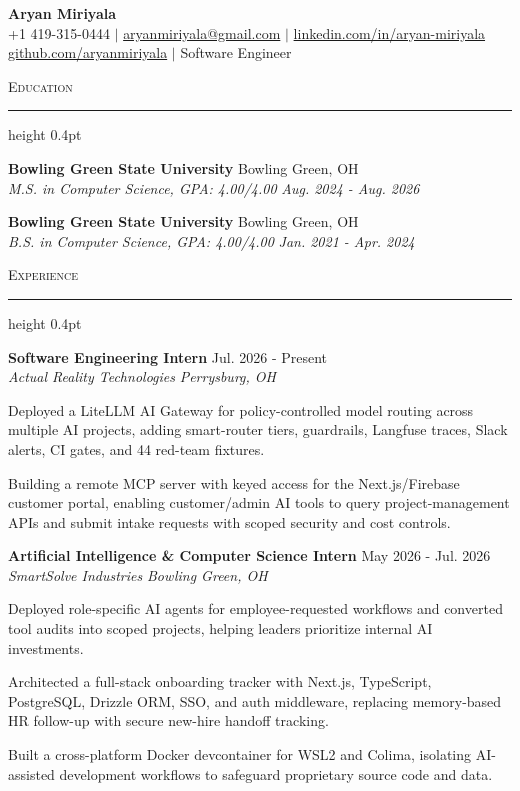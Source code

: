 \documentclass[letterpaper,11pt]{article}
\newcommand{\resumesection}[1]{%
  \par\vspace{2pt}%
  {\large\scshape #1}\par\vspace{2pt}%
  \hrule height 0.4pt\vspace{2pt}%
}
\newcommand{\resumeSubheading}[4]{
  \textbf{#1} \hfill #2\\
  \textit{#3} \hfill \textit{#4}
}
\begin{document}
\begin{center}
  {\LARGE \textbf{Aryan Miriyala}}\\[2pt]
  \small
  +1 419-315-0444 $|$ \href{mailto:aryanmiriyala@gmail.com}{aryanmiriyala@gmail.com} $|$ \href{https://www.linkedin.com/in/aryan-miriyala-7788a21b6/}{linkedin.com/in/aryan-miriyala}\\
  \href{https://github.com/aryanmiriyala}{github.com/aryanmiriyala} $|$ Software Engineer
\end{center}\vspace{-6pt}

\resumesection{Education}
\resumeSubheading
{Bowling Green State University}{Bowling Green, OH}
{M.S. in Computer Science, GPA: 4.00/4.00}{Aug. 2024 - Aug. 2026}

\resumeSubheading
{Bowling Green State University}{Bowling Green, OH}
{B.S. in Computer Science, GPA: 4.00/4.00}{Jan. 2021 - Apr. 2024}

\resumesection{Experience}
\resumeSubheading
{Software Engineering Intern}{Jul. 2026 - Present}
{Actual Reality Technologies}{Perrysburg, OH}
\begin{tightitemize}
  \item Deployed a LiteLLM AI Gateway for policy-controlled model routing across multiple AI projects, adding smart-router tiers, guardrails, Langfuse traces, Slack alerts, CI gates, and 44 red-team fixtures.
  \item Building a remote MCP server with keyed access for the Next.js/Firebase customer portal, enabling customer/admin AI tools to query project-management APIs and submit intake requests with scoped security and cost controls.
\end{tightitemize}

\resumeSubheading
{Artificial Intelligence \& Computer Science Intern}{May 2026 - Jul. 2026}
{SmartSolve Industries}{Bowling Green, OH}
\begin{tightitemize}
  \item Deployed role-specific AI agents for employee-requested workflows and converted tool audits into scoped projects, helping leaders prioritize internal AI investments.
  \item Architected a full-stack onboarding tracker with Next.js, TypeScript, PostgreSQL, Drizzle ORM, SSO, and auth middleware, replacing memory-based HR follow-up with secure new-hire handoff tracking.
  \item Built a cross-platform Docker devcontainer for WSL2 and Colima, isolating AI-assisted development workflows to safeguard proprietary source code and data.
\end{tightitemize}
\end{document}
